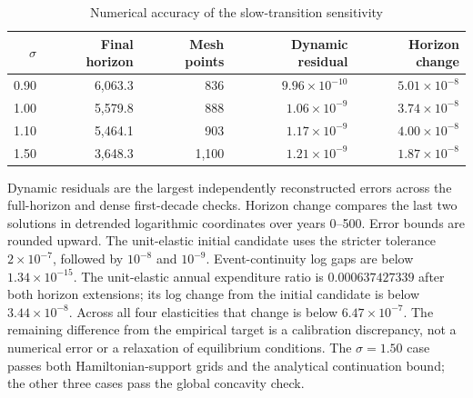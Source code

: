 \begin{table}[H]
 \centering
 \caption{Numerical accuracy of the slow-transition sensitivity}
 \label{tab:rewrite-research-share-accuracy}
 \small
 \begin{tabular}{rrrrr}
 \toprule
 $\sigma$ & Final horizon & Mesh points & Dynamic residual & Horizon change\\
 \midrule
 0.90 & 6,063.3 & 836 & $9.96\times10^{-10}$ & $5.01\times10^{-8}$\\
 1.00 & 5,579.8 & 888 & $1.06\times10^{-9}$ & $3.74\times10^{-8}$\\
 1.10 & 5,464.1 & 903 & $1.17\times10^{-9}$ & $4.00\times10^{-8}$\\
 1.50 & 3,648.3 & 1,100 & $1.21\times10^{-9}$ & $1.87\times10^{-8}$\\
 \bottomrule
 \end{tabular}
 \par\smallskip
 \begin{minipage}{0.95\textwidth}\footnotesize
 Dynamic residuals are the largest independently reconstructed errors
 across the full-horizon and dense first-decade checks. Horizon change
 compares the last two solutions in detrended logarithmic coordinates
 over years 0--500. Error bounds are rounded upward.
 The unit-elastic initial candidate uses the stricter tolerance
 $2\times10^{-7}$, followed by $10^{-8}$ and $10^{-9}$. Event-continuity
 log gaps are below $1.34\times10^{-15}$. The unit-elastic annual expenditure
 ratio is $0.000637427339$ after both horizon extensions; its log change
 from the initial candidate is below $3.44\times10^{-8}$. Across all four
 elasticities that change is below $6.47\times10^{-7}$. The remaining difference
 from the empirical target is a calibration discrepancy, not a numerical
 error or a relaxation of equilibrium conditions. The $\sigma=1.50$ case
 passes both Hamiltonian-support grids and the analytical continuation
 bound; the other three cases pass the global concavity check.
 \end{minipage}
\end{table}
